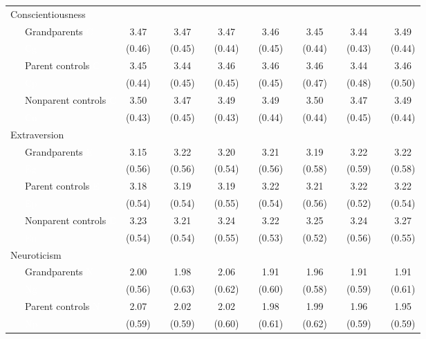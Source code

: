 \documentclass[
  english,
  man,floatsintext]{apa7}
\newenvironment{lltable}{\begin{landscape}\begin{center}\begin{ThreePartTable}}{\end{ThreePartTable}\end{center}\end{landscape}}
\begin{document}
\begin{lltable}
{\begin{longtable}{lccccccccccccc}
Conscientiousness &  &  &  &  &  &  &  &  &  &  &  &  & \\
\ \ \ Grandparents \textcolor{white}{C} & 3.47 &  & 3.47 &  & 3.47 &  & 3.46 &  & 3.45 &  & 3.44 &  & 3.49\\
\ \ \ \textcolor{white}{Cg} & (0.46) &  & (0.45) &  & (0.44) &  & (0.45) &  & (0.44) &  & (0.43) &  & (0.44)\\
\ \ \ Parent controls \textcolor{white}{C} & 3.45 &  & 3.44 &  & 3.46 &  & 3.46 &  & 3.46 &  & 3.44 &  & 3.46\\
\ \ \ \textcolor{white}{Cp} & (0.44) &  & (0.45) &  & (0.45) &  & (0.45) &  & (0.47) &  & (0.48) &  & (0.50)\\
\ \ \ Nonparent controls \textcolor{white}{C} & 3.50 &  & 3.47 &  & 3.49 &  & 3.49 &  & 3.50 &  & 3.47 &  & 3.49\\
\ \ \ \textcolor{white}{Cn} & (0.43) &  & (0.45) &  & (0.43) &  & (0.44) &  & (0.44) &  & (0.45) &  & (0.44)\\
Extraversion &  &  &  &  &  &  &  &  &  &  &  &  & \\
\ \ \ Grandparents \textcolor{white}{E} & 3.15 &  & 3.22 &  & 3.20 &  & 3.21 &  & 3.19 &  & 3.22 &  & 3.22\\
\ \ \ \textcolor{white}{Eg} & (0.56) &  & (0.56) &  & (0.54) &  & (0.56) &  & (0.58) &  & (0.59) &  & (0.58)\\
\ \ \ Parent controls \textcolor{white}{E} & 3.18 &  & 3.19 &  & 3.19 &  & 3.22 &  & 3.21 &  & 3.22 &  & 3.22\\
\ \ \ \textcolor{white}{Ep} & (0.54) &  & (0.54) &  & (0.55) &  & (0.54) &  & (0.56) &  & (0.52) &  & (0.54)\\
\ \ \ Nonparent controls \textcolor{white}{E} & 3.23 &  & 3.21 &  & 3.24 &  & 3.22 &  & 3.25 &  & 3.24 &  & 3.27\\
\ \ \ \textcolor{white}{En} & (0.54) &  & (0.54) &  & (0.55) &  & (0.53) &  & (0.52) &  & (0.56) &  & (0.55)\\
Neuroticism &  &  &  &  &  &  &  &  &  &  &  &  & \\
\ \ \ Grandparents \textcolor{white}{N} & 2.00 &  & 1.98 &  & 2.06 &  & 1.91 &  & 1.96 &  & 1.91 &  & 1.91\\
\ \ \ \textcolor{white}{Ng} & (0.56) &  & (0.63) &  & (0.62) &  & (0.60) &  & (0.58) &  & (0.59) &  & (0.61)\\
\ \ \ Parent controls \textcolor{white}{N} & 2.07 &  & 2.02 &  & 2.02 &  & 1.98 &  & 1.99 &  & 1.96 &  & 1.95\\
\ \ \ \textcolor{white}{Np} & (0.59) &  & (0.59) &  & (0.60) &  & (0.61) &  & (0.62) &  & (0.59) &  & (0.59)\\

\end{longtable}}
\end{lltable}
\end{document}
